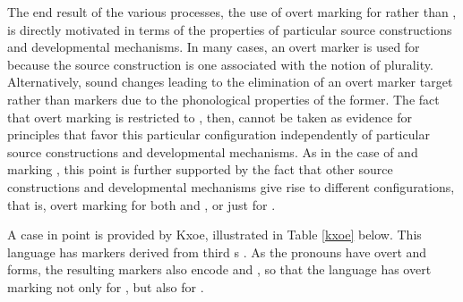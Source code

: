 \documentclass[output=paper]{langsci/langscibook}
\begin{document}
The end result of the various processes, the use of  overt marking for
 rather than , is directly motivated in
terms of the properties of particular source constructions and
developmental mechanisms.  In many cases,  an overt
marker is  used for  because the source construction is one associated with the notion of
plurality. Alternatively, sound changes leading to the elimination of
an overt marker target  rather than  markers due to the
phonological properties of the former. The fact that overt marking
is restricted to , then, cannot be taken as evidence for
principles that favor this particular configuration independently of
particular source constructions and developmental mechanisms. As in
the case of  and   marking , this point
is further supported by the fact that other source
constructions and developmental mechanisms give rise to different
configurations, that is, overt marking for both  and ,
or just for .

A case in point is provided by Kxoe,
illustrated in Table \ref{kxoe} below. This language has 
markers derived from third  s \citep{Heine1982}. As the
pronouns have overt  and  forms, the resulting 
markers also encode  and , so that the language has
overt marking not only for , but also for .
\end{document}
